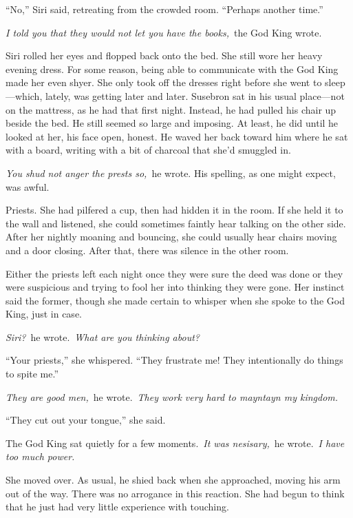 “No,” Siri said, retreating from the crowded room. “Perhaps another time.”

\orn

\textit{I told you that they would not let you have the books,}~the God King wrote.

Siri rolled her eyes and flopped back onto the bed. She still wore her heavy evening dress. For some reason, being able to communicate with the God King made her even shyer. She only took off the dresses right before she went to sleep—which, lately, was getting later and later. Susebron sat in his usual place—not on the mattress, as he had that first night. Instead, he had pulled his chair up beside the bed. He still seemed so large and imposing. At least, he did until he looked at her, his face open, honest. He waved her back toward him where he sat with a board, writing with a bit of charcoal that she’d smuggled in.

\textit{You shud not anger the prests so,}~he wrote. His spelling, as one might expect, was awful.

Priests. She had pilfered a cup, then had hidden it in the room. If she held it to the wall and listened, she could sometimes faintly hear talking on the other side. After her nightly moaning and bouncing, she could usually hear chairs moving and a door closing. After that, there was silence in the other room.

Either the priests left each night once they were sure the deed was done or they were suspicious and trying to fool her into thinking they were gone. Her instinct said the former, though she made certain to whisper when she spoke to the God King, just in case.

\textit{Siri?}~he wrote.~\textit{What are you thinking about?}

“Your priests,” she whispered. “They frustrate me! They intentionally do things to spite me.”

\textit{They are good men,}~he wrote.~\textit{They work very hard to mayntayn my kingdom.}

“They cut out your tongue,” she said.

The God King sat quietly for a few moments.~\textit{It was nesisary,}~he wrote.~\textit{I have too much power.}

She moved over. As usual, he shied back when she approached, moving his arm out of the way. There was no arrogance in this reaction. She had begun to think that he just had very little experience with touching.

